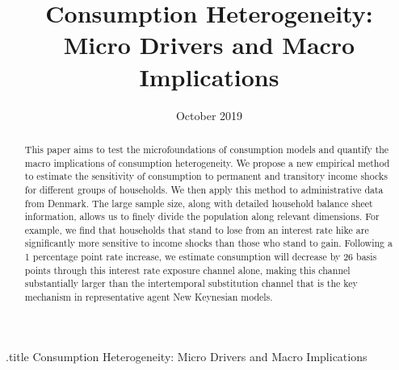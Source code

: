 \documentclass[titlepage]{\econtex}\newcommand{\texname}{ConsumptionHeterogeneity}
\begin{document}


%
\begin{verbatimwrite}{\jobname.title}
Consumption Heterogeneity: Micro Drivers and Macro Implications
\end{verbatimwrite}


\title{ 
	\bigskip
	\bigskip
	Consumption Heterogeneity: \\ Micro Drivers and Macro Implications}



\date{October 2019}
\maketitle


\begin{abstract}
	This paper aims to test the microfoundations of consumption models and quantify the macro implications of consumption heterogeneity. We propose a new empirical method to estimate the sensitivity of consumption to permanent and transitory income shocks for different groups of households. We then apply this method to administrative data from Denmark. The large sample size, along with detailed household balance sheet information, allows us to finely divide the population along relevant dimensions. For example, we find that households that stand to lose from an interest rate hike are significantly more sensitive to income shocks than those who stand to gain. Following a 1 percentage point rate increase, we estimate consumption will decrease by 26 basis points through this interest rate exposure channel alone, making this channel substantially larger than the intertemporal substitution channel that is the key mechanism in representative agent New Keynesian models.
%  
\end{abstract}
\end{document}
